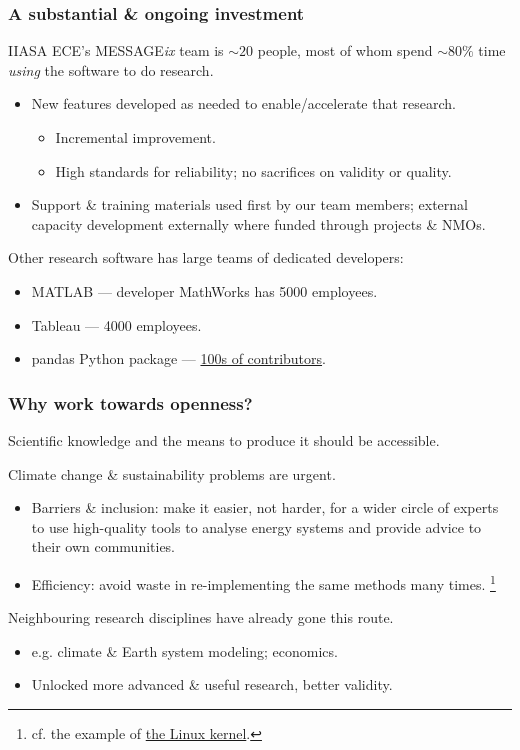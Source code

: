 \documentclass[12pt,aspectratio=169]{beamer}
\begin{document}
\begin{frame}
\frametitle{A substantial \& ongoing investment}

IIASA ECE's MESSAGE\emph{ix} team is $\sim 20$ people, most of whom spend $\sim 80\%$ time \emph{using} the software to do research.

\begin{itemize}
  \item New features developed as needed to enable/accelerate that research.
  \begin{itemize}
    \item Incremental improvement.
    \item High standards for reliability; no sacrifices on validity or quality.
  \end{itemize}
  \item Support \& training materials used first by our team members; external capacity development externally where funded through projects \& NMOs.
\end{itemize}

\medskip
Other research software has large teams of dedicated developers:
\begin{itemize}
  \item MATLAB — developer MathWorks has 5000 employees.
  \item Tableau — 4000 employees.
  \item pandas Python package — \href{https://pandas.pydata.org/docs/whatsnew/v1.4.0.html\#contributors}{100s of contributors}.
\end{itemize}

\end{frame}


\begin{frame}
\frametitle{Why work towards openness?}

Scientific knowledge and the means to produce it should be accessible.

\medskip
Climate change \& sustainability problems are urgent.
\begin{itemize}
  \item Barriers \& inclusion: make it easier, not harder, for a wider circle of experts to use high-quality tools to analyse energy systems and provide advice to their own communities.
  \item Efficiency: avoid waste in re-implementing the same methods many times.%
  \footnote{cf. the example of \href{https://en.wikipedia.org/wiki/Linux_kernel\#Estimated_cost_to_redevelop}{the Linux kernel}.}
\end{itemize}

\medskip
Neighbouring research disciplines have already gone this route.
\begin{itemize}
  \item e.g. climate \& Earth system modeling; economics.
  \item Unlocked more advanced \& useful research, better validity.
\end{itemize}

\end{frame}
\end{document}
